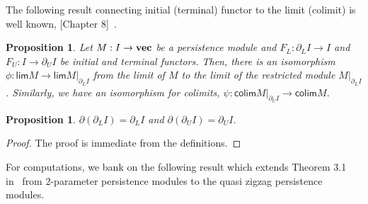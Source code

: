 \documentclass{article}
\renewcommand{\varprojlim}{\mathsf{lim}}
\renewcommand{\varinjlim}{\mathsf{colim}}
\theoremstyle{plain}
\newtheorem{proposition}[theorem]{Proposition}
\theoremstyle{definition}
\theoremstyle{remark}
\begin{document}

The following result connecting initial (terminal) functor to the limit (colimit)
is well known, [Chapter 8]~\cite{Riehl14}. 

\begin{proposition}
    Let $M: I\rightarrow {\bf vec}$ be a persistence module and $F_L: \partial_L I\rightarrow I$
    and $F_U: I\rightarrow \partial_U I$ be initial and terminal functors. Then, there
    is an isomorphism $\phi: \varprojlim{M}\rightarrow \varprojlim{M|_{\partial_L I}}$ from the limit of $M$ to the limit of the restricted module $M|_{\partial_L I}$. Similarly, we have an isomorphism for colimits, $\psi: \varinjlim{M|_{\partial_U I}}\rightarrow \varinjlim{M}$.
    \label{prop:fences}
\end{proposition}

\begin{proposition}
    $\partial (\partial_L I)=\partial_L I$ and $\partial (\partial_U I)=\partial_U I$.
    \label{prop:boudnarycap}
\end{proposition}
\begin{proof}
    The proof is immediate from the definitions.
\end{proof}
For computations, we bank on the following result which
extends Theorem 3.1 in~\cite{DKM24} from $2$-parameter persistence modules to the quasi zigzag persistence modules.
\end{document}
